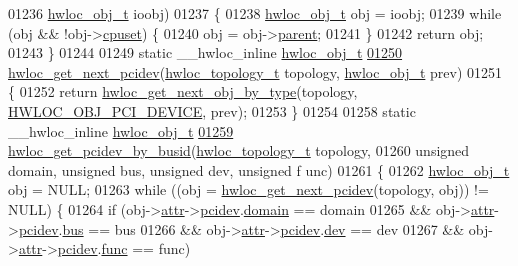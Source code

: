 \begin{DoxyCode}
01236                               \hyperlink{a00016}{hwloc_obj_t} ioobj)
01237 \{
01238   \hyperlink{a00016}{hwloc_obj_t} obj = ioobj;
01239   \textcolor{keywordflow}{while} (obj && !obj->\hyperlink{a00016_a67925e0f2c47f50408fbdb9bddd0790f}{cpuset}) \{
01240     obj = obj->\hyperlink{a00016_adc494f6aed939992be1c55cca5822900}{parent};
01241   \}
01242   \textcolor{keywordflow}{return} obj;
01243 \}
01244 
01249 \textcolor{keyword}{static} \_\_hwloc\_inline \hyperlink{a00016}{hwloc_obj_t}
\hypertarget{a00031_source_l01250}{}\hyperlink{a00064_gad6e1ed122ef3b6e098538d75acd5e3f6}{01250} \hyperlink{a00064_gad6e1ed122ef3b6e098538d75acd5e3f6}{hwloc_get_next_pcidev}(\hyperlink{a00039_ga9d1e76ee15a7dee158b786c30b6a6e38}{hwloc_topology_t} topology, \hyperlink{a00016}{hwloc_obj_t} prev)
01251 \{
01252   \textcolor{keywordflow}{return} \hyperlink{a00053_ga5f08ceb69375341e73563cfe2e77534e}{hwloc_get_next_obj_by_type}(topology, \hyperlink{a00041_ggacd37bb612667dc437d66bfb175a8dc55a5d8117a54df1fbd3606ab19e42cb0ea9}{HWLOC_OBJ_PCI_DEVICE}, prev);
01253 \}
01254 
01258 \textcolor{keyword}{static} \_\_hwloc\_inline \hyperlink{a00016}{hwloc_obj_t}
\hypertarget{a00031_source_l01259}{}\hyperlink{a00064_ga546e1d690c63fb24177f3013ed78ceb1}{01259} \hyperlink{a00064_ga546e1d690c63fb24177f3013ed78ceb1}{hwloc_get_pcidev_by_busid}(\hyperlink{a00039_ga9d1e76ee15a7dee158b786c30b6a6e38}{hwloc_topology_t} topology,
01260                           \textcolor{keywordtype}{unsigned} domain, \textcolor{keywordtype}{unsigned} bus, \textcolor{keywordtype}{unsigned} dev, \textcolor{keywordtype}{unsigned} f
      unc)
01261 \{
01262   \hyperlink{a00016}{hwloc_obj_t} obj = NULL;
01263   \textcolor{keywordflow}{while} ((obj = \hyperlink{a00064_gad6e1ed122ef3b6e098538d75acd5e3f6}{hwloc_get_next_pcidev}(topology, obj)) != NULL) \{
01264     \textcolor{keywordflow}{if} (obj->\hyperlink{a00016_accd40e29f71f19e88db62ea3df02adc8}{attr}->\hyperlink{a00017_a4203d713ce0f5beaa6ee0e9bdac70828}{pcidev}.\hyperlink{a00022_a8fba44988deb98613c1505a4019a34dc}{domain} == domain
01265         && obj->\hyperlink{a00016_accd40e29f71f19e88db62ea3df02adc8}{attr}->\hyperlink{a00017_a4203d713ce0f5beaa6ee0e9bdac70828}{pcidev}.\hyperlink{a00022_aae99e035e8d1387d7b8768aaa8eceb0a}{bus} == bus
01266         && obj->\hyperlink{a00016_accd40e29f71f19e88db62ea3df02adc8}{attr}->\hyperlink{a00017_a4203d713ce0f5beaa6ee0e9bdac70828}{pcidev}.\hyperlink{a00022_a3d70c84a12f7e93d14c8d47bf4fd9dc5}{dev} == dev
01267         && obj->\hyperlink{a00016_accd40e29f71f19e88db62ea3df02adc8}{attr}->\hyperlink{a00017_a4203d713ce0f5beaa6ee0e9bdac70828}{pcidev}.\hyperlink{a00022_a695f32df53f4ef728670bfcf31b74e0f}{func} == func)

\end{DoxyCode}

